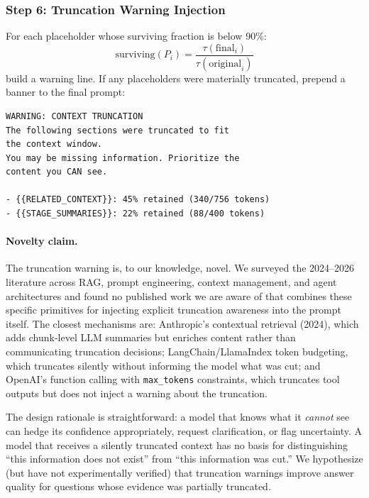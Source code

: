 \documentclass[11pt]{article}
\begin{document}
\subsubsection{Step 6: Truncation Warning Injection}

For each placeholder whose surviving fraction is below 90\%:
\begin{equation}
\text{surviving}(P_i) = \frac{\tau(\text{final}_i)}{\tau(\text{original}_i)}
\label{eq:surviving}
\end{equation}
build a warning line.  If any placeholders were materially truncated,
prepend a banner to the final prompt:

\begin{verbatim}
WARNING: CONTEXT TRUNCATION
The following sections were truncated to fit
the context window.
You may be missing information. Prioritize the
content you CAN see.

- {{RELATED_CONTEXT}}: 45% retained (340/756 tokens)
- {{STAGE_SUMMARIES}}: 22% retained (88/400 tokens)
\end{verbatim}

\paragraph{Novelty claim.}
The truncation warning is, to our knowledge, novel.  We surveyed the
2024--2026 literature across RAG, prompt engineering, context
management, and agent architectures and found no published work we are aware of that combines these specific primitives
for injecting explicit truncation awareness into the prompt itself.
The closest mechanisms are: Anthropic's contextual retrieval (2024),
which adds chunk-level LLM summaries but enriches content rather than
communicating truncation decisions; LangChain/LlamaIndex token
budgeting, which truncates silently without informing the model what
was cut; and OpenAI's function calling with \texttt{max\_tokens}
constraints, which truncates tool outputs but does not inject a
warning about the truncation.

The design rationale is straightforward: a model that knows what it
\emph{cannot} see can hedge its confidence appropriately, request
clarification, or flag uncertainty.  A model that receives a silently
truncated context has no basis for distinguishing ``this information
does not exist'' from ``this information was cut.''  We hypothesize
(but have not experimentally verified) that truncation warnings
improve answer quality for questions whose evidence was partially
truncated.
\end{document}
